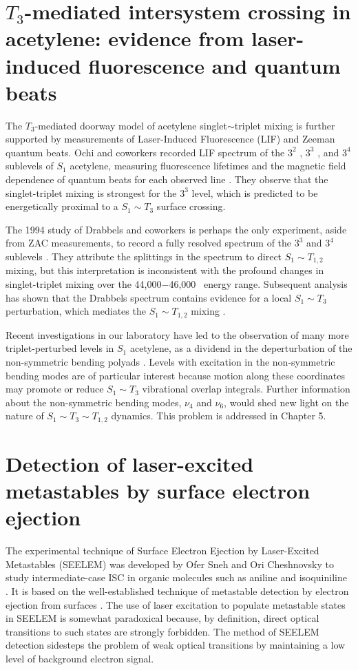 \section{$T_3$-mediated intersystem crossing in acetylene: evidence
  from laser-induced fluorescence and quantum beats}

The $T_3$-mediated doorway model of acetylene singlet$\sim$triplet
mixing is further supported by measurements of Laser-Induced
Fluorescence (LIF) and Zeeman quantum beats.  Ochi and coworkers
recorded LIF spectrum of the $3^2$ , $3^3$ , and $3^4$
 sublevels of $S_1$ acetylene, measuring fluorescence lifetimes
and the magnetic field dependence of quantum beats for each observed
line \cite{ochi91}.  They observe that the singlet-triplet mixing is
strongest for the $3^3$  level, which is predicted to be
energetically proximal to a $S_1 \sim T_3$ surface crossing.

The 1994 study of Drabbels and coworkers is perhaps the only
experiment, aside from ZAC measurements, to record a fully resolved
spectrum of the $3^3$  and $3^4$  sublevels
\cite{drabbels94}.  They attribute the splittings in the spectrum to
direct $S_1 \sim T_{1,2}$ mixing, but this interpretation is
inconsistent with the profound changes in singlet-triplet mixing over
the 44,000$-$46,000 \rcm\ energy range.  Subsequent analysis has shown
that the Drabbels spectrum contains evidence for a local $S_1 \sim
T_3$ perturbation, which mediates the $S_1 \sim T_{1,2}$ mixing
\cite{altunata01}.

Recent investigations in our laboratory have led to the observation of
many more triplet-perturbed levels in $S_1$ acetylene, as a dividend
in the deperturbation of the non-symmetric bending polyads
\cite{merer08, steeves08}.  Levels with excitation in the
non-symmetric bending modes are of particular interest because motion
along these coordinates may promote or reduce $S_1 \sim T_3$
vibrational overlap integrals.  Further information about the
non-symmetric bending modes, $\nu_4$ and $\nu_6$, would shed new light
on the nature of $S_1 \sim T_3 \sim T_{1,2}$ dynamics.  This problem
is addressed in Chapter 5.

\section{Detection of laser-excited metastables by surface electron
  ejection}

The experimental technique of Surface Electron Ejection by
Laser-Excited Metastables (SEELEM) was developed by Ofer Sneh and Ori
Cheshnovsky to study intermediate-case ISC in organic molecules such
as aniline and isoquiniline \cite{sneh86, sneh88, sneh89a, sneh89b,
  sneh91}.  It is based on the well-established technique of
metastable detection by electron ejection from surfaces
\cite{hotop96}.  The use of laser excitation to populate metastable
states in SEELEM is somewhat paradoxical because, by definition,
direct optical transitions to such states are strongly forbidden.  The
method of SEELEM detection sidesteps the problem of weak optical
transitions by maintaining a low level of background electron signal.


